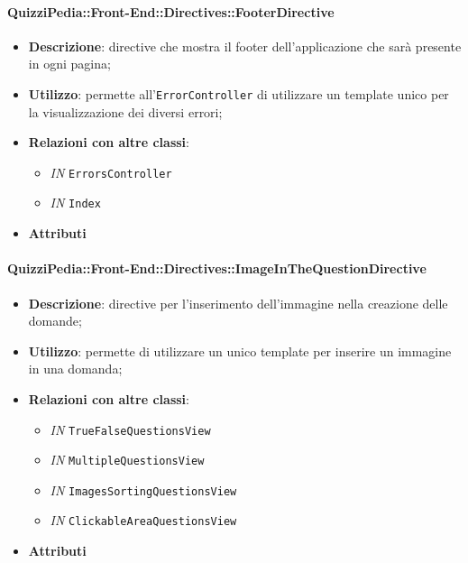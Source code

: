 \paragraph{QuizziPedia::Front-End::Directives::FooterDirective}
\begin{itemize}
	\item \textbf{Descrizione}: directive che mostra il footer dell'applicazione che sarà presente in ogni pagina;
	\item \textbf{Utilizzo}: permette all'\texttt{ErrorController} di utilizzare un template unico per la visualizzazione dei diversi errori;
	\item \textbf{Relazioni con altre classi}:
	\begin{itemize}
		\item \textit{IN} \texttt{ErrorsController}
		\item \textit{IN} \texttt{Index}
	\end{itemize}
	\item \textbf{Attributi}
\end{itemize}

\paragraph{QuizziPedia::Front-End::Directives::ImageInTheQuestionDirective}
\begin{itemize}
	\item \textbf{Descrizione}: directive per l'inserimento dell'immagine nella creazione delle domande;
	\item \textbf{Utilizzo}: permette di utilizzare un unico template per inserire un immagine in una domanda;
	\item \textbf{Relazioni con altre classi}:
	\begin{itemize}
		\item \textit{IN} \texttt{TrueFalseQuestionsView} \\
		\item \textit{IN} \texttt{MultipleQuestionsView} \\
		\item \textit{IN} \texttt{ImagesSortingQuestionsView} \\
		\item \textit{IN} \texttt{ClickableAreaQuestionsView} \\
	\end{itemize}
	\item \textbf{Attributi}
\end{itemize}